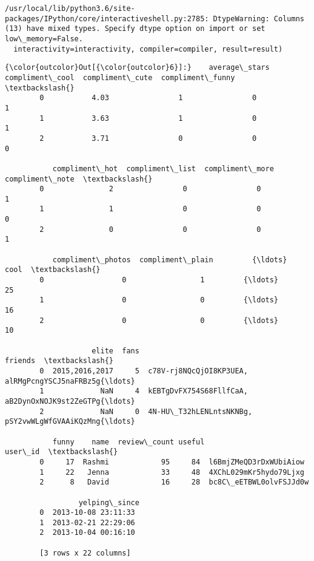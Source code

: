 \documentclass[11pt]{article}
\begin{document}
    \begin{Verbatim}[commandchars=\\\{\}]
/usr/local/lib/python3.6/site-packages/IPython/core/interactiveshell.py:2785: DtypeWarning: Columns (13) have mixed types. Specify dtype option on import or set low\_memory=False.
  interactivity=interactivity, compiler=compiler, result=result)

    \end{Verbatim}

\begin{Verbatim}[commandchars=\\\{\}]
{\color{outcolor}Out[{\color{outcolor}6}]:}    average\_stars  compliment\_cool  compliment\_cute  compliment\_funny  \textbackslash{}
        0           4.03                1                0                 1   
        1           3.63                1                0                 1   
        2           3.71                0                0                 0   
        
           compliment\_hot  compliment\_list  compliment\_more  compliment\_note  \textbackslash{}
        0               2                0                0                1   
        1               1                0                0                0   
        2               0                0                0                1   
        
           compliment\_photos  compliment\_plain         {\ldots}           cool  \textbackslash{}
        0                  0                 1         {\ldots}             25   
        1                  0                 0         {\ldots}             16   
        2                  0                 0         {\ldots}             10   
        
                    elite  fans                                            friends  \textbackslash{}
        0  2015,2016,2017     5  c78V-rj8NQcQjOI8KP3UEA, alRMgPcngYSCJ5naFRBz5g{\ldots}   
        1             NaN     4  kEBTgDvFX754S68FllfCaA, aB2DynOxNOJK9st2ZeGTPg{\ldots}   
        2             NaN     0  4N-HU\_T32hLENLntsNKNBg, pSY2vwWLgWfGVAAiKQzMng{\ldots}   
        
           funny    name  review\_count useful                 user\_id  \textbackslash{}
        0     17  Rashmi            95     84  l6BmjZMeQD3rDxWUbiAiow   
        1     22   Jenna            33     48  4XChL029mKr5hydo79Ljxg   
        2      8   David            16     28  bc8C\_eETBWL0olvFSJJd0w   
        
                 yelping\_since  
        0  2013-10-08 23:11:33  
        1  2013-02-21 22:29:06  
        2  2013-10-04 00:16:10  
        
        [3 rows x 22 columns]
\end{Verbatim}
            
\end{document}
